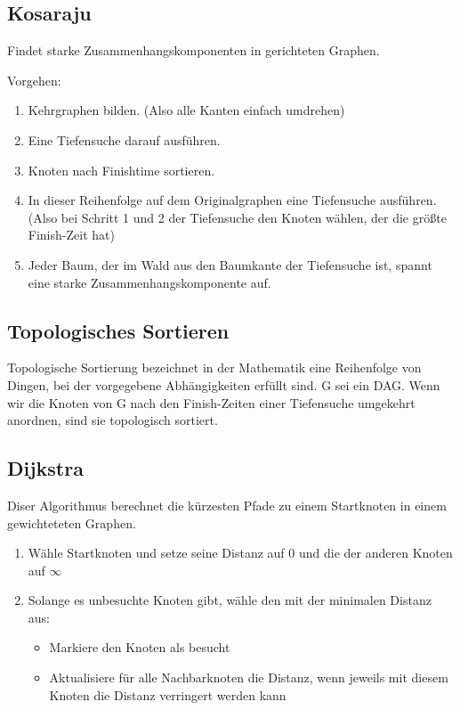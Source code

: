 \documentclass[11pt]{scrartcl}
\begin{document}
\subsection{Kosaraju}
Findet starke Zusammenhangskomponenten in gerichteten Graphen.

Vorgehen:
\begin{enumerate}
\item Kehrgraphen bilden. (Also alle Kanten einfach umdrehen)
\item Eine Tiefensuche darauf ausführen.
\item Knoten nach Finishtime sortieren.
\item In dieser Reihenfolge auf dem Originalgraphen eine Tiefensuche ausführen. (Also bei Schritt 1 und 2 der Tiefensuche den Knoten wählen, der die größte Finish-Zeit hat)
\item Jeder Baum, der im Wald aus den Baumkante der Tiefensuche ist, spannt eine starke Zusammenhangskomponente auf.
\end{enumerate}
\subsection{Topologisches Sortieren}
Topologische Sortierung bezeichnet in der Mathematik eine Reihenfolge von Dingen, bei der vorgegebene Abhängigkeiten erfüllt sind.
G sei ein DAG. Wenn wir die Knoten von G nach den Finish-Zeiten einer Tiefensuche umgekehrt anordnen, sind sie topologisch sortiert.

\subsection{Dijkstra}
Diser Algorithmus berechnet die kürzesten Pfade zu einem Startknoten in einem gewichteteten Graphen.
\begin{enumerate}
	\item Wähle Startknoten und setze seine Distanz auf 0 und die der anderen Knoten auf $\infty$
    \item Solange es unbesuchte Knoten gibt, wähle den mit der minimalen Distanz aus:
    \begin{itemize}
		\item Markiere den Knoten als besucht
        \item Aktualisiere für alle Nachbarknoten die Distanz, wenn jeweils mit diesem Knoten die Distanz verringert werden kann
	\end{itemize}
\end{enumerate}
\end{document}
